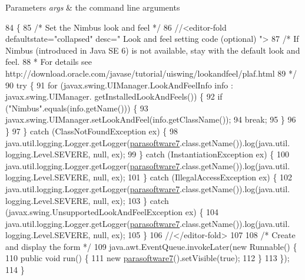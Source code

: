 \begin{DoxyParams}{Parameters}
{\em args} & the command line arguments \\
\hline
\end{DoxyParams}

\begin{DoxyCode}
84                                            \{
85         \textcolor{comment}{/* Set the Nimbus look and feel */}
86         \textcolor{comment}{//<editor-fold defaultstate="collapsed" desc=" Look and feel setting code (optional) ">}
87         \textcolor{comment}{/* If Nimbus (introduced in Java SE 6) is not available, stay with the default look and feel.}
88 \textcolor{comment}{         * For details see http://download.oracle.com/javase/tutorial/uiswing/lookandfeel/plaf.html }
89 \textcolor{comment}{         */}
90         \textcolor{keywordflow}{try} \{
91             \textcolor{keywordflow}{for} (javax.swing.UIManager.LookAndFeelInfo info : javax.swing.UIManager.
      getInstalledLookAndFeels()) \{
92                 \textcolor{keywordflow}{if} (\textcolor{stringliteral}{"Nimbus"}.equals(info.getName())) \{
93                     javax.swing.UIManager.setLookAndFeel(info.getClassName());
94                     \textcolor{keywordflow}{break};
95                 \}
96             \}
97         \} \textcolor{keywordflow}{catch} (ClassNotFoundException ex) \{
98             java.util.logging.Logger.getLogger(\mbox{\hyperlink{classsoftware_1_1parasoftware7_a6c9418145b285cdcee5407d2f413c85b}{parasoftware7}}.class.getName()).log(java.util.
      logging.Level.SEVERE, null, ex);
99         \} \textcolor{keywordflow}{catch} (InstantiationException ex) \{
100             java.util.logging.Logger.getLogger(\mbox{\hyperlink{classsoftware_1_1parasoftware7_a6c9418145b285cdcee5407d2f413c85b}{parasoftware7}}.class.getName()).log(java.util.
      logging.Level.SEVERE, null, ex);
101         \} \textcolor{keywordflow}{catch} (IllegalAccessException ex) \{
102             java.util.logging.Logger.getLogger(\mbox{\hyperlink{classsoftware_1_1parasoftware7_a6c9418145b285cdcee5407d2f413c85b}{parasoftware7}}.class.getName()).log(java.util.
      logging.Level.SEVERE, null, ex);
103         \} \textcolor{keywordflow}{catch} (javax.swing.UnsupportedLookAndFeelException ex) \{
104             java.util.logging.Logger.getLogger(\mbox{\hyperlink{classsoftware_1_1parasoftware7_a6c9418145b285cdcee5407d2f413c85b}{parasoftware7}}.class.getName()).log(java.util.
      logging.Level.SEVERE, null, ex);
105         \}
106         \textcolor{comment}{//</editor-fold>}
107 
108         \textcolor{comment}{/* Create and display the form */}
109         java.awt.EventQueue.invokeLater(\textcolor{keyword}{new} Runnable() \{
110             \textcolor{keyword}{public} \textcolor{keywordtype}{void} run() \{
111                 \textcolor{keyword}{new} \mbox{\hyperlink{classsoftware_1_1parasoftware7_a6c9418145b285cdcee5407d2f413c85b}{parasoftware7}}().setVisible(\textcolor{keyword}{true});
112             \}
113         \});
114     \}
\end{DoxyCode}


